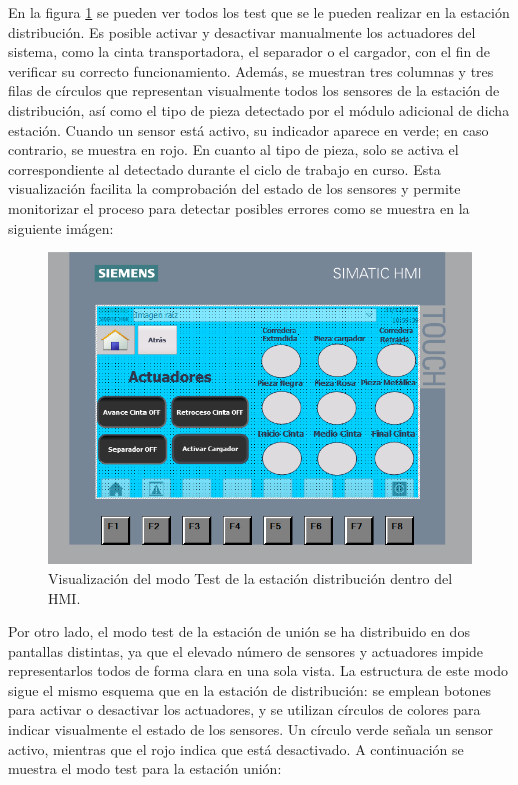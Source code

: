 En la figura \ref{fig:HMI_test_distribucion} se pueden ver todos los test que se le pueden realizar en la estación distribución. Es posible activar y desactivar manualmente los actuadores del sistema, como la cinta transportadora, el separador o el cargador, con el fin de verificar su correcto funcionamiento. Además, se muestran tres columnas y tres filas de círculos que representan visualmente todos los sensores de la estación de distribución, así como el tipo de pieza detectado por el módulo adicional de dicha estación. Cuando un sensor está activo, su indicador aparece en verde; en caso contrario, se muestra en rojo. En cuanto al tipo de pieza, solo se activa el correspondiente al detectado durante el ciclo de trabajo en curso. Esta visualización facilita la comprobación del estado de los sensores y permite monitorizar el proceso para detectar posibles errores como se muestra en la siguiente imágen: 

\begin{figure}[h!]
  \begin{center}
  	\includegraphics[width=13.5cm]{figs/HMI_test_distribucion}
  \end{center}
  \caption{\centering Visualización del modo Test de la estación distribución dentro del HMI.}
  \label{fig:HMI_test_distribucion}
\end{figure}

Por otro lado, el modo test de la estación de unión se ha distribuido en dos pantallas distintas, ya que el elevado número de sensores y actuadores impide representarlos todos de forma clara en una sola vista. La estructura de este modo sigue el mismo esquema que en la estación de distribución: se emplean botones para activar o desactivar los actuadores, y se utilizan círculos de colores para indicar visualmente el estado de los sensores. Un círculo verde señala un sensor activo, mientras que el rojo indica que está desactivado. A continuación se muestra el modo test para la estación unión:

